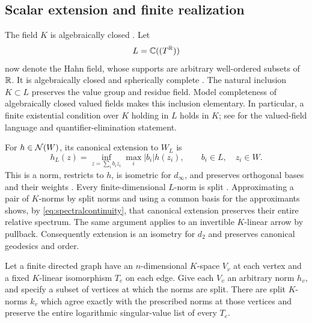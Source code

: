 \subsection{Scalar extension and finite realization}
The field $K$ is algebraically closed
\cite[Appendix~A, Lemma~A.1]{FOOO10}. Let
\[
 L=\mathbb C((T^\mathbb R))
\]
now denote the Hahn field, whose supports are arbitrary well-ordered
subsets of $\mathbb R$. It is algebraically closed and spherically complete
\cite[Lemma~4, Theorem~1 and Corollary~4]{Poonen93}. The natural inclusion $K\subset L$ preserves the
value group and residue field. Model completeness of algebraically
closed valued fields makes this inclusion elementary. In particular,
a finite existential condition over $K$ holding in $L$ holds in $K$;
see \cite[Definitions~2.1--2.2 and Theorem~3.10]{Yin10} for the valued-field
language and quantifier-elimination statement.

For $h\in\mathcal N(W)$, its canonical extension to $W_L$ is
\begin{equation}\label{eq:scalarextension}
 h_L(z)=\inf_{z=\sum_i b_i z_i}\max_i |b_i|h(z_i),
 \qquad b_i\in L,\quad z_i\in W.
\end{equation}
This is a norm, restricts to $h$, is isometric for $d_\infty$, and
preserves orthogonal bases and their weights
\cite[Definition~1.24 and Proposition~1.25]{BE21}.
Every finite-dimensional $L$-norm is split \cite[Lemma~1.12]{BE21}. Approximating a pair of
$K$-norms by split norms and using a common basis for the approximants
shows, by \eqref{eq:spectralcontinuity}, that canonical extension
preserves their entire relative spectrum. The same argument applies
to an invertible $K$-linear arrow by pullback. Consequently extension
is an isometry for $d_2$ and preserves canonical geodesics and order.

\begin{lemma}\label{lem:finiterealization}
Let a finite directed graph have an $n$-dimensional $K$-space $V_v$ at
each vertex and a fixed $K$-linear isomorphism $T_e$ on each edge.
Give each $V_v$ an arbitrary norm $h_v$, and specify a subset of
vertices at which the norms are split. There are split $K$-norms $k_v$
which agree exactly with the prescribed norms at those vertices and
preserve the entire logarithmic singular-value list of every $T_e$.
\end{lemma}

